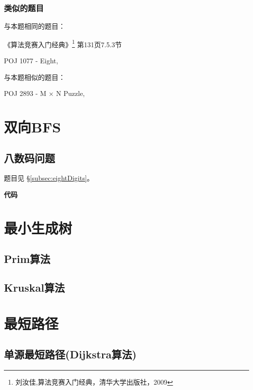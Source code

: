 \subsubsection{类似的题目}
与本题相同的题目：
\begindot
\item 《算法竞赛入门经典》\footnote{刘汝佳,算法竞赛入门经典，清华大学出版社，2009} 第131页7.5.3节
\item  POJ 1077 - Eight, 
\myenddot

与本题相似的题目：
\begindot
\item  POJ 2893 - M × N Puzzle, 
\myenddot

\section{双向BFS} %
\label{sec:biBFS}
\subsection{八数码问题}
题目见 \S \ref{subsec:eightDigits}。

\textbf{代码}

\begin{Codex}[label=eight_digits_bibfs.c]
\end{Codex}

\section{最小生成树} %

\subsection{Prim算法}

\subsection{Kruskal算法}

\section{最短路径} %

\subsection{单源最短路径(Dijkstra算法)}

